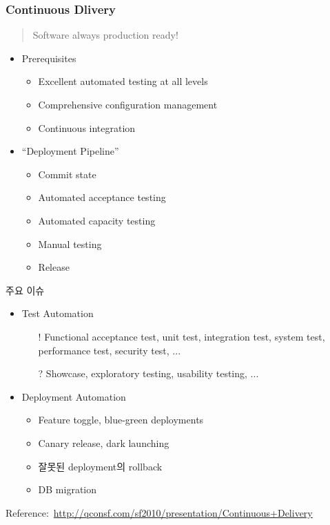 \begin{frame}[allowframebreaks]
\frametitle{Continuous Dlivery}

\begin{quote}
Software always production ready!
\end{quote}

\begin{itemize}
  \item Prerequisites 
  \begin{itemize}
  \item Excellent automated testing at all levels
  \item Comprehensive configuration management
  \item Continuous integration
  \end{itemize}

  \item ``Deployment Pipeline''
  \begin{itemize}
  \item Commit state
  \item Automated acceptance testing
  \item Automated capacity testing
  \item Manual testing
  \item Release
  \end{itemize}
\end{itemize}

\pagebreak

주요 이슈
 
\begin{itemize}
\item Test Automation
  \begin{itemize}
  \item[!] Functional acceptance test, unit test, integration test,
    system test, performance test, security test, ...
  \item[?] Showcase, exploratory testing, usability testing, ...
  \end{itemize}
\item Deployment Automation
  \begin{itemize}
  \item Feature toggle, blue-green deployments
  \item Canary release, dark launching
  \item 잘못된 deployment의 rollback
  \item DB migration %
  \end{itemize}
\end{itemize}

\vfill

\mbox{\tiny Reference: \url{http://qconsf.com/sf2010/presentation/Continuous+Delivery}}

\end{frame}
